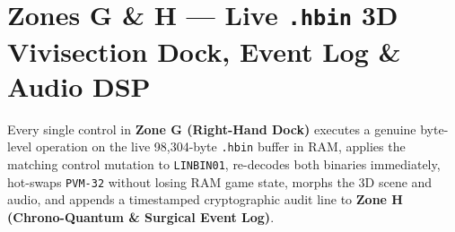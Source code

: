 \documentclass[10pt,letterpaper]{article}
\begin{document}
\FloatBarrier
\section{Zones G \& H --- Live \texttt{.hbin} 3D Vivisection Dock, Event Log \& Audio DSP}
\label{sec:dock}

Every single control in \textbf{Zone G (Right-Hand Dock)} executes a genuine byte-level operation on the live 98,304-byte \texttt{.hbin} buffer in RAM, applies the matching control mutation to \texttt{LINBIN01}, re-decodes both binaries immediately, hot-swaps \texttt{PVM-32} without losing RAM game state, morphs the 3D scene and audio, and appends a timestamped cryptographic audit line to \textbf{Zone H (Chrono-Quantum \& Surgical Event Log)}.
\end{document}
